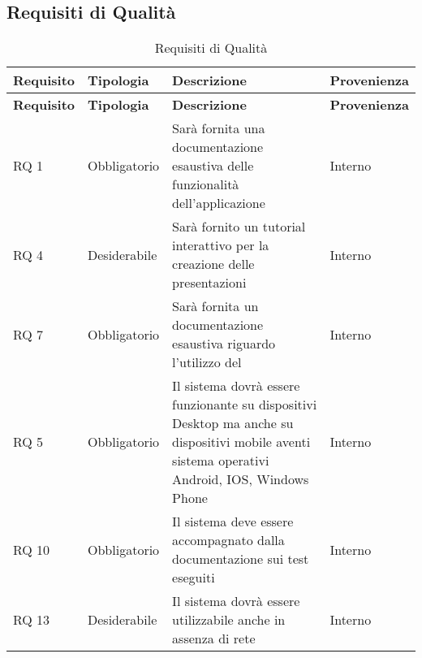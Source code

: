 \subsection{Requisiti di Qualità}{
		\renewcommand*{\arraystretch}{1.4}
		\begin{longtable} [c]{| p{2.5cm} | p{2.5cm} | p{6cm} |p{2.5cm}|}
			\caption{Requisiti di Qualità \label{tab:reqQualita}}\\
			 \hline
			 \textbf{Requisito} & \textbf{Tipologia} & \textbf{Descrizione} & \textbf{Provenienza} \\
			 \hline
			 \endfirsthead
			 \hline
			 \textbf{Requisito} & \textbf{Tipologia} & \textbf{Descrizione} & \textbf{Provenienza} \\
			 \hline
				\endhead
			 \hline
			 \endfoot
			 \hline
			 \endlastfoot
			RQ 1 & Obbligatorio & Sarà fornita una documentazione esaustiva delle funzionalità dell'applicazione & Interno\\
			\hline
			RQ 4 & Desiderabile & Sarà fornito un tutorial interattivo per la creazione delle presentazioni & Interno\\
			\hline
			RQ 7 & Obbligatorio & Sarà fornita un documentazione esaustiva riguardo l'utilizzo del & Interno\\
			\hline
			RQ 5 & Obbligatorio & Il sistema dovrà essere funzionante su dispositivi Desktop ma anche su dispositivi mobile aventi sistema operativi Android, IOS, Windows Phone & Interno\\
			\hline
			RQ 10 & Obbligatorio & Il sistema deve essere accompagnato dalla documentazione sui test eseguiti & Interno\\
			\hline
			RQ 13 & Desiderabile & Il sistema dovrà essere utilizzabile anche in assenza di rete & Interno\\			
		\end{longtable}
	}